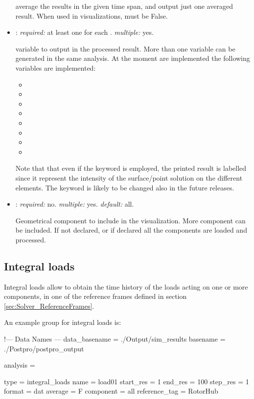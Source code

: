 \begin{itemize}
average the results in the given time span, and output just one averaged result. 
When used in visualizations,  must be False.

\item {}: \textit{required:} at least one for each . 
\textit{multiple:} yes.

variable to output in the processed result. More than one variable can be generated 
in the same analysis. At the moment are implemented the following variables are implemented: 
\begin{itemize}
  \item {}
  \item {}
  \item {}
  \item {}
  \item {}
  \item {}
  \item {}
  \item {}
\end{itemize} 
Note that that even if the keyword  is employed, the printed result 
is labelled  since it represent the intensity of the 
surface/point solution on the different elements. The keyword is likely to 
be changed also in the future releases.

\item {}: \textit{required:} no. \textit{multiple:} yes. \textit{default:} all.

Geometrical component to include in the visualization. More component can be included. 
If not declared, or if declared  all the components are loaded and processed. 
\end{itemize}

\subsection{Integral loads}

Integral loads allow to obtain the time history of the loads acting on one 
or more components, in one of the reference frames defined in section 
\ref{sec:Solver_ReferenceFrames}.

An example  group for integral loads is:

\begin{inputfile}[frame=single, caption={dust\_post.in for integral loads}, 
  label={file:dust_post.in_load}]
!--- Data Names ---
data_basename = ./Output/sim_results
basename =     ./Postpro/postpro_output

analysis = {

type = integral_loads
name = load01
start_res = 1
end_res   = 100 
step_res  = 1
format = dat
average = F
component = all
reference_tag = RotorHub

}
\end{inputfile}

